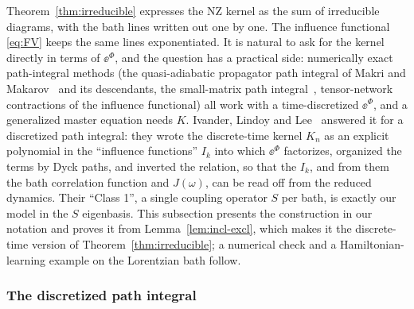 Theorem~\ref{thm:irreducible} expresses the NZ kernel as the sum of irreducible diagrams, with the bath lines written out one by one.
The influence functional \eqref{eq:FV} keeps the same lines exponentiated.
It is natural to ask for the kernel directly in terms of $\ee^{\Phi}$, and the question has a practical side: numerically exact path-integral methods (the quasi-adiabatic propagator path integral of Makri and Makarov~\cite{MakriMakarov1995} and its descendants, the small-matrix path integral~\cite{Makri2020}, tensor-network contractions of the influence functional) all work with a time-discretized $\ee^\Phi$, and a generalized master equation needs $K$.
Ivander, Lindoy and Lee~\cite{IvanderLindoyLee2024} answered it for a discretized path integral: they wrote the discrete-time kernel $K_n$ as an explicit polynomial in the ``influence functions'' $I_k$ into which $\ee^\Phi$ factorizes, organized the terms by Dyck paths, and inverted the relation, so that the $I_k$, and from them the bath correlation function and $J(\omega)$, can be read off from the reduced dynamics.
Their ``Class 1'', a single coupling operator $S$ per bath, is exactly our model in the $S$ eigenbasis.
This subsection presents the construction in our notation and proves it from Lemma~\ref{lem:incl-excl}, which makes it the discrete-time version of Theorem~\ref{thm:irreducible}; a numerical check and a Hamiltonian-learning example on the Lorentzian bath follow.

\subsubsection{The discretized path integral}

